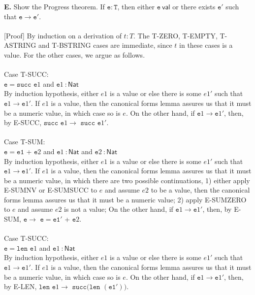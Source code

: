 \documentclass[a4paper]{article}
\begin{document}
\textbf{E.} Show the Progress theorem. If $\mathtt e : \mathtt T$, then either
$\mathtt e~\mathsf{val}$ or there exists $\mathtt{e'}$ such that $\mathtt e
\rightarrow \mathtt{e'}$.\\\\
{[Proof]} By induction on a derivation of $t:T$. The T-ZERO, T-EMPTY, T-ASTRING and T-BSTRING cases are immediate, since $t$ in these cases is a value. For the other cases, we argue as follows.\\\\
Case T-SUCC:\\
$\mathtt {e = succ}$ $\mathtt e1$ and $\mathtt e1 ~\mathsf {: Nat}$\\
By induction hypothesis, either $e1$ is a value or else there is some $e1'$ such that $\mathtt e1 \rightarrow \mathtt e1'$. If $e1$ is a value, then the canonical forms lemma assures us that it must be a numeric value, in which case so is $e$. On the other hand, if $\mathtt e1 \rightarrow \mathtt e1'$, then, by E-SUCC, $\mathtt {succ}$ $\mathtt e1 \rightarrow$ $\mathtt {succ}$ $\mathtt e1'$.\\\\
Case T-SUM:\\
$\mathtt {e = e1}$ + $\mathtt e2$ and $\mathtt e1 ~\mathsf {: Nat}$ and $\mathtt e2 ~\mathsf {: Nat}$\\
By induction hypothesis, either $e1$ is a value or else there is some $e1'$ such that $\mathtt e1 \rightarrow \mathtt e1'$. If $e1$ is a value, then the canonical forms lemma assures us that it must be a numeric value, in which there are two possible continuations, 1) either apply E-SUMNV or E-SUMSUCC to $e$ and assume $e2$ to be a value, then the canonical forms lemma assures us that it must be a numeric value; 2) apply E-SUMZERO to $e$ and assume $e2$ is not a value; On the other hand, if $\mathtt e1 \rightarrow \mathtt e1'$, then, by E-SUM, $\mathtt e \rightarrow$ $\mathtt {e = e1'}$ + $\mathtt e2$.\\\\
Case T-SUCC:\\
$\mathtt {e = len}$ $\mathtt e1$ and $\mathtt e1 ~\mathsf {: Nat}$\\
By induction hypothesis, either $e1$ is a value or else there is some $e1'$ such that $\mathtt e1 \rightarrow \mathtt e1'$. If $e1$ is a value, then the canonical forms lemma assures us that it must be a numeric value, in which case so is $e$. On the other hand, if $\mathtt e1 \rightarrow \mathtt e1'$, then, by E-LEN, $\mathtt {len}$ $\mathtt e1 \rightarrow$ $\mathtt {succ(len}$ $\mathtt {(e1')})$.\\
\end{document}
